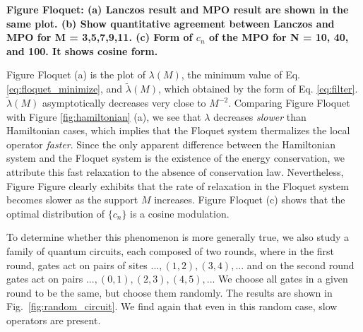 \documentclass[twocolumn,superscriptaddress, prb]{revtex4-1}
\begin{document}
{\bf Figure Floquet: (a) Lanczos result and MPO result are shown in the same plot. (b) Show quantitative agreement between Lanczos and MPO for M = 3,5,7,9,11. (c) Form of $c_n$ of the MPO for N = 10, 40, and 100. It shows cosine form.}

Figure Floquet (a) is the plot of $\lambda (M)$, the minimum value of Eq. \ref{eq:floquet_minimize}, and 
$\tilde{\lambda}(M)$, which obtained by the form of Eq. \eqref{eq:filter}. 
$\tilde{\lambda}(M)$ asymptotically decreases very close to $M^{-2}$. 
Comparing Figure Floquet with Figure \ref{fig:hamiltonian} (a),
we see that $\lambda$ decreases {\it slower} than Hamiltonian cases, which implies that the Floquet system thermalizes
the local operator {\it faster}. Since the only apparent difference between the Hamiltonian system and the Floquet system
is the existence of the energy conservation, we attribute this fast relaxation to the absence of conservation law.
Nevertheless, Figure Figure clearly exhibits that the rate of relaxation in the Floquet system
becomes slower as the support $M$ increases. 
Figure Floquet (c) shows that the optimal distribution of $\{ c_n\}$ is a cosine modulation. 




To determine whether this phenomenon is more generally true, we also study a family of quantum circuits, each composed of two rounds, where in the first round, gates act on pairs of sites $...,(1,2),(3,4),...$ and on the second round gates act on pairs $...,(0,1),(2,3),(4,5),...$ 
We choose all gates in a given round to be the same, but choose them randomly.  
The results are shown in Fig.~\ref{fig:random_circuit}. 
We find again that even in this random case, slow operators are present. 
 
\end{document}
